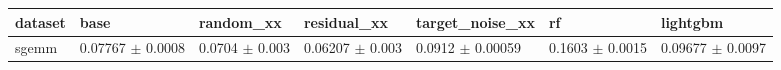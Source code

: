 \begin{tabular}{lllllll}
\toprule
dataset & base & random\_xx & residual\_xx & target\_noise\_xx & rf & lightgbm \\
\midrule
sgemm & 0.07767 $\pm$ 0.0008 & 0.0704 $\pm$ 0.003 & 0.06207 $\pm$ 0.003 & 0.0912 $\pm$ 0.00059 & 0.1603 $\pm$ 0.0015 & 0.09677 $\pm$ 0.0097 \\
\bottomrule
\end{tabular}
